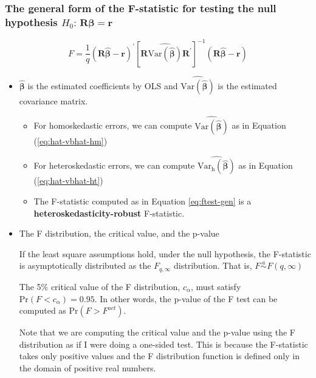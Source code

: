 \documentclass[a4paper,11pt]{article}
\newcommand{\var}{\mathrm{Var}}
\newcommand{\pr}{\mathrm{Pr}}
\begin{document}
\subsubsection*{The general form of the F-statistic for testing the null hypothesis \(H_0:\, \mathbf{R}\boldsymbol{\beta} = \mathbf{r}\)}
\label{sec:org29954f2}

\begin{equation}
\label{eq:ftest-gen}
F = \frac{1}{q}(\mathbf{R}\hat{\boldsymbol{\beta}} - \mathbf{r})^{\prime} \left[ \mathbf{R} \widehat{\var(\hat{\boldsymbol{\beta}})} \mathbf{R}^{\prime} \right]^{-1} (\mathbf{R}\hat{\boldsymbol{\beta}} - \mathbf{r})
\end{equation}
\begin{itemize}
\item \(\hat{\boldsymbol{\beta}}\) is the estimated coefficients by OLS and
\(\widehat{\var(\hat{\boldsymbol{\beta}})}\) is the estimated covariance
matrix.
\begin{itemize}
\item For homoskedastic errors, we can compute
\(\widehat{\var(\hat{\boldsymbol{\beta}})}\) as in Equation (\ref{eq:hat-vbhat-hm})
\item For heteroskedastic errors, we can compute
\(\widehat{\var_{\mathrm{h}}(\hat{\boldsymbol{\beta}})}\) as in
Equation (\ref{eq:hat-vbhat-ht})
\item The F-statistic computed as in Equation \eqref{eq:ftest-gen} is
a \textbf{heteroskedasticity-robust} F-statistic.
\end{itemize}
\end{itemize}

\begin{itemize}
\item The F distribution, the critical value, and the p-value
\label{sec:org9e1943e}

If the least square assumptions hold, under the null hypothesis, the
F-statistic is asymptotically distributed as the \(F_{q, \infty}\)
distribution. That is, \(F \overset{a}{\sim} F(q, \infty)\)

The 5\% critical value of the F distribution, \(c_{\alpha}\), must
satisfy \(\pr(F < c_{\alpha}) = 0.95\). In other words, the p-value of
the F test can be computed as \(\pr(F > F^{act})\).

Note that we are computing the
critical value and the p-value using the F distribution as if I were
doing a one-sided test. This is because the F-statistic takes only
positive values and the F distribution function is defined only in the
domain of positive real numbers.
\end{itemize}
\end{document}
